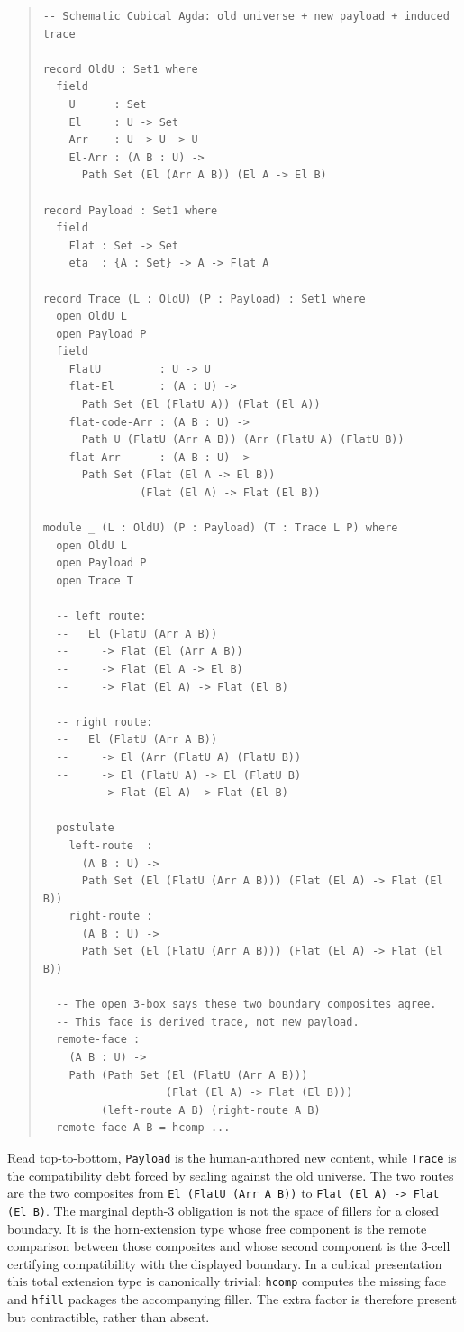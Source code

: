 \documentclass{lmcs}
\begin{document}
\begin{quote}
\begin{verbatim}
-- Schematic Cubical Agda: old universe + new payload + induced trace

record OldU : Set1 where
  field
    U      : Set
    El     : U -> Set
    Arr    : U -> U -> U
    El-Arr : (A B : U) ->
      Path Set (El (Arr A B)) (El A -> El B)

record Payload : Set1 where
  field
    Flat : Set -> Set
    eta  : {A : Set} -> A -> Flat A

record Trace (L : OldU) (P : Payload) : Set1 where
  open OldU L
  open Payload P
  field
    FlatU         : U -> U
    flat-El       : (A : U) ->
      Path Set (El (FlatU A)) (Flat (El A))
    flat-code-Arr : (A B : U) ->
      Path U (FlatU (Arr A B)) (Arr (FlatU A) (FlatU B))
    flat-Arr      : (A B : U) ->
      Path Set (Flat (El A -> El B))
               (Flat (El A) -> Flat (El B))

module _ (L : OldU) (P : Payload) (T : Trace L P) where
  open OldU L
  open Payload P
  open Trace T

  -- left route:
  --   El (FlatU (Arr A B))
  --     -> Flat (El (Arr A B))
  --     -> Flat (El A -> El B)
  --     -> Flat (El A) -> Flat (El B)

  -- right route:
  --   El (FlatU (Arr A B))
  --     -> El (Arr (FlatU A) (FlatU B))
  --     -> El (FlatU A) -> El (FlatU B)
  --     -> Flat (El A) -> Flat (El B)

  postulate
    left-route  :
      (A B : U) ->
      Path Set (El (FlatU (Arr A B))) (Flat (El A) -> Flat (El B))
    right-route :
      (A B : U) ->
      Path Set (El (FlatU (Arr A B))) (Flat (El A) -> Flat (El B))

  -- The open 3-box says these two boundary composites agree.
  -- This face is derived trace, not new payload.
  remote-face :
    (A B : U) ->
    Path (Path Set (El (FlatU (Arr A B)))
                   (Flat (El A) -> Flat (El B)))
         (left-route A B) (right-route A B)
  remote-face A B = hcomp ...
\end{verbatim}
\end{quote}

Read top-to-bottom, \texttt{Payload} is the human-authored new content, while \texttt{Trace} is the compatibility debt forced by sealing against the old universe. The two routes are the two composites from \texttt{El (FlatU (Arr A B))} to \texttt{Flat (El A) -> Flat (El B)}. The marginal depth-$3$ obligation is not the space of fillers for a closed boundary. It is the horn-extension type whose free component is the remote comparison between those composites and whose second component is the $3$-cell certifying compatibility with the displayed boundary. In a cubical presentation this total extension type is canonically trivial: \texttt{hcomp} computes the missing face and \texttt{hfill} packages the accompanying filler. The extra factor is therefore present but contractible, rather than absent.
\end{document}
